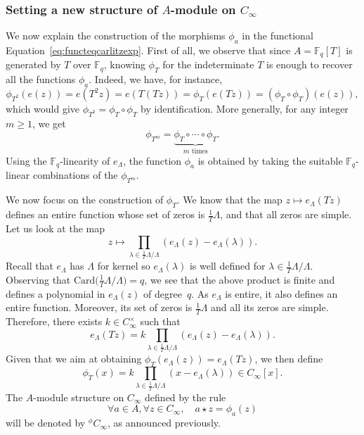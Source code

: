 \documentclass[11pt]{article}
\theoremstyle{definition}
\renewcommand\geq{\geqslant}
\newcommand\Fq{\mathbb{F}_q}
\newcommand{\Cinf}{C_{\infty}}
\newcommand{\phiact}[1]{{}^\phi\! #1}
\begin{document}
\subsubsection{Setting a new structure of \texorpdfstring{$A$}{e}-module on \texorpdfstring{$\Cinf$}{C\_∞}}
We now explain the construction of the morphisms $\phi_a$ in the functional Equation~\eqref{eq:functeqcarlitzexp}.
First of all, we observe that since $A=\Fq[T]$ is generated by $T$ over $\Fq$, knowing $\phi_T$ for the indeterminate 
$T$ is enough to recover all the functions $\phi_a$. Indeed, we have, for instance,
$$ \phi_{T^2}(e(z)) = e(T^2 z) = e(T(Tz)) = \phi_T(e(Tz)) = (\phi_T \circ \phi_T)(e(z)),$$
which would give $\phi_{T^2}= \phi_T \circ \phi_T$ by identification.
More generally, for any integer $m\geq1$, we get 
$$\phi_{T^m} =\underbrace{\phi_T \circ \cdots \circ \phi_T}_{m \text{ times}}.$$
Using the $\Fq$-linearity of $e_\Lambda$, 
the function $\phi_{a}$ is obtained by taking the suitable $\Fq$-linear
combinations of the $\phi_{T^m}$.

We now focus on the construction of $\phi_T$.
We know that the map $z \mapsto e_\Lambda(Tz)$ defines an entire function 
whose set of zeros is $\frac{1}{T}\Lambda$, and that all zeros are simple. Let us 
look at the map
$$z \mapsto \prod_{\lambda \in \frac{1}{T} \Lambda / \Lambda} (e_\Lambda(z)-e_\Lambda(\lambda)).$$
Recall that $e_\Lambda$ has $\Lambda$ for kernel so $e_\Lambda(\lambda)$ is well defined for $\lambda \in \frac{1}{T} \Lambda / \Lambda$. 
Observing that $\text{Card}\big(\frac{1}{T} \Lambda / \Lambda\big) = q$, we see that the above product is finite and defines a polynomial in $e_\Lambda(z)$ of degree~$q$.
As $e_\Lambda$ is entire, it also defines an entire function.
Moreover, its set of zeros is $\frac{1}{T}\Lambda$ and all its zeros are 
simple. Therefore, there exists $k\in\Cinf^\times$ such that
\begin{equation}
\label{eq-eTz}
e_\Lambda(Tz)= k\displaystyle\prod_{\lambda \in \frac 1 T  \Lambda / \Lambda} (e_\Lambda(z)-e_\Lambda(\lambda)).
\end{equation}
Given that we aim at obtaining $\phi_T(e_\Lambda(z)) = e_\Lambda(Tz)$, we then define
\begin{equation}
\label{eq-phiT}
\phi_T(x) = k \displaystyle\prod_{\lambda \in \frac 1 T  \Lambda / \Lambda} (x-e_\Lambda(\lambda))\in \Cinf[x].
\end{equation}
The $A$-module structure on $C_\infty$ defined by the rule
\begin{equation}
\label{eq-phiCinf}
\forall a \in A, \forall z \in \Cinf, \quad a \star z = \phi_a(z)
\end{equation}
will be denoted by $\phiact\Cinf$, as announced previously.
\end{document}
